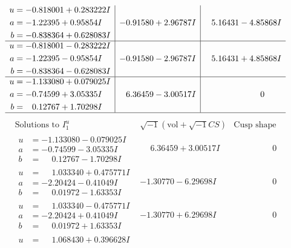 \documentclass[1p]{elsarticle_modified}
\theoremstyle{definition}
\newcommand{\I}{\sqrt{-1}}
\begin{document}
$$\begin{array}{c|c|c}
\begin{aligned}
u &= -0.818001 + 0.283222 I \\
a &= -1.22395 + 0.95854 I \\
b &= -0.838364 + 0.628083 I\end{aligned}
 & -0.91580 + 2.96787 I & \phantom{-}5.16431 - 4.85868 I \\ \hline\begin{aligned}
u &= -0.818001 - 0.283222 I \\
a &= -1.22395 - 0.95854 I \\
b &= -0.838364 - 0.628083 I\end{aligned}
 & -0.91580 - 2.96787 I & \phantom{-}5.16431 + 4.85868 I \\ \hline\begin{aligned}
u &= -1.133080 + 0.079025 I \\
a &= -0.74599 + 3.05335 I \\
b &= \phantom{-}0.12767 + 1.70298 I\end{aligned}
 & \phantom{-}6.36459 - 3.00517 I & \phantom{-0.000000 } 0\\
 \hline 
 \end{array}$$\newpage$$\begin{array}{c|c|c}  
\text{Solutions to }I^u_{1}& \I (\text{vol} + \sqrt{-1}CS) & \text{Cusp shape}\\
 \hline 
\begin{aligned}
u &= -1.133080 - 0.079025 I \\
a &= -0.74599 - 3.05335 I \\
b &= \phantom{-}0.12767 - 1.70298 I\end{aligned}
 & \phantom{-}6.36459 + 3.00517 I & \phantom{-0.000000 } 0 \\ \hline\begin{aligned}
u &= \phantom{-}1.033340 + 0.475771 I \\
a &= -2.20424 - 0.41049 I \\
b &= \phantom{-}0.01972 - 1.63353 I\end{aligned}
 & -1.30770 - 6.29698 I & \phantom{-0.000000 } 0 \\ \hline\begin{aligned}
u &= \phantom{-}1.033340 - 0.475771 I \\
a &= -2.20424 + 0.41049 I \\
b &= \phantom{-}0.01972 + 1.63353 I\end{aligned}
 & -1.30770 + 6.29698 I & \phantom{-0.000000 } 0 \\ \hline\begin{aligned}
u &= \phantom{-}1.068430 + 0.396628 I \\

\end{aligned}
\end{array}$$
\end{document}
